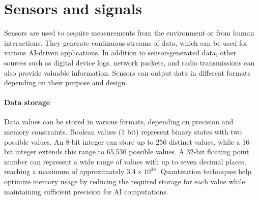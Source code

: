 \section{Sensors and signals}

Sensors are used to acquire measurements from the environment or from human interactions. 
They generate continuous streams of data, which can be used for various AI-driven applications. 
In addition to sensor-generated data, other sources such as digital device logs, network packets, and radio transmissions can also provide valuable information. 
Sensors can output data in different formats depending on their purpose and design.

\paragraph*{Data storage}
Data values can be stored in various formats, depending on precision and memory constraints. 
Boolean values (1 bit) represent binary states with two possible values. 
An 8-bit integer can store up to 256 distinct values, while a 16-bit integer extends this range to 65,536 possible values. 
A 32-bit floating point number can represent a wide range of values with up to seven decimal places, reaching a maximum of approximately $3.4\times 10^{38}$.
Quantization techniques help optimize memory usage by reducing the required storage for each value while maintaining sufficient precision for AI computations.